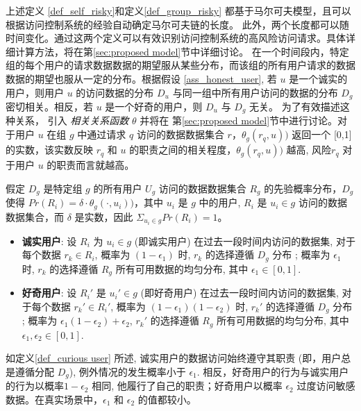 上述定义 \ref{def_self_risky}和定义\ref{def_group_risky} 都基于马尔可夫模型，且可以根据访问控制系统的经验自动确定马尔可夫链的长度。 此外，两个长度都可以随时间变化。通过这两个定义可以有效识别访问控制系统的高风险访问请求。具体详细计算方法，将在第\ref{sec:proposed model}节中详细讨论。 在一个时间段内，特定组的每个用户的请求数据数据的期望服从某些分布，而该组的所有用户请求的数据数据的期望也服从一定的分布。根据假设 \ref{ass_honest_user}, 若 $u$ 是一个诚实的用户，则用户 $u$ 的访问数据的分布 $D_u$ 与同一组中所有用户访问的数据的分布 $D_g$ 密切相关。相反，若 $u$ 是一个好奇的用户，则 $D_u$ 与 $D_g$ 无关。 为了有效描述这种关系， 引入 \emph{相关关系函数} $\theta$ 并将在 第\ref{sec:proposed model}节中进行讨论。对于用户 $u$ 在组 $g$ 中通过请求 $q$ 访问的数据数据集合 $r$，$\theta_g (r_q,u))$ 返回一个 [0,1]的实数，该实数反映 $r_q$ 和 $u$ 的职责之间的相关程度，$\theta_g (r_q,u))$ 越高, 风险$r_q$ 对于用户 $u$ 的职责而言就越高。


\begin{definition}%
	\label{def_curious user}
	假定 $D_g$ 是特定组 $g$ 的所有用户 $U_g$ 访问的数据数据集合 $R_g$ 的先验概率分布，$D_g$ 使得 $Pr(R_i)=\delta \cdot \theta_g (\cdot,u_i))$，其中 $u_i$ 是 $g$ 中的用户, $R_i$ 是 $u_i \in g$ 访问的数据数据集合，而 $\delta$ 是实数，因此 $\Sigma_{u_i \in g}Pr(R_i) = 1$。
	\begin{itemize}
		\item \textbf{诚实用户}: 设 $R_i$ 为 $u_i \in g$ (即诚实用户) 在过去一段时间内访问的数据集, 对于每个数据 $r_k \in R_i$, 概率为 $(1-\epsilon_1)$ 时,  $r_k$ 的选择遵循 $D_g$ 分布 ; 概率为 $\epsilon_1$ 时,  $r_k$ 的选择遵循 $R_g$ 所有可用数据的均匀分布, 其中 $\epsilon_1 \in [0,1]$.
		\item \textbf{好奇用户}: 设 $R_i'$ 是 $u_i' \in g$ (即好奇用户) 在过去一段时间内访问的数据集, 对于每个数据 $r_k' \in R_i'$, 概率为 $(1-\epsilon_1)(1-\epsilon_2)$ 时,  $r_k'$ 的选择遵循 $D_g$ 分布 ; 概率为 $\epsilon_1 (1 - \epsilon_2)+ \epsilon_2$,  $r_k'$ 的选择遵循 $R_g$ 所有可用数据的均匀分布, 其中 $\epsilon_1, \epsilon_2 \in [0,1]$.
	\end{itemize}
\end{definition}

如定义\ref{def_curious user} 所述, 诚实用户的数据访问始终遵守其职责 (即，用户总是遵循分配 $D_g$), 例外情况的发生概率小于 $\epsilon_1$. 相反，好奇用户的行为与诚实用户的行为以概率$1-\epsilon_2$ 相同, 他履行了自己的职责；好奇用户以概率 $\epsilon_2$ 过度访问敏感数据。在真实场景中，$\epsilon_1$ 和 $\epsilon_2$ 的值都较小。


